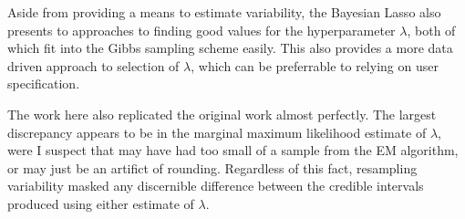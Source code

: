 \documentclass{uwstat572}
\begin{document}
Aside from providing a means to estimate variability, the Bayesian Lasso also presents to approaches to finding good values for the hyperparameter $\lambda$, both of which fit into the Gibbs sampling scheme easily. This also provides a more data driven approach to selection of $\lambda$, which can be preferrable to relying on user specification.

The work here also replicated the original work almost perfectly. The largest discrepancy appears to be in the marginal maximum likelihood estimate of $\lambda$, were I suspect that \cite{park2008bayesian} may have had too small of a sample from the EM algorithm, or may just be an artifict of rounding. Regardless of this fact, resampling variability masked any discernible difference between the credible intervals produced using either estimate of $\lambda$.  


\end{document}
